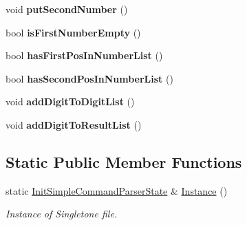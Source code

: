 \begin{DoxyCompactItemize}
\item 
\hypertarget{class_init_simple_command_parser_state_ae2125d4779a25e75508e1987d238e68a}{}void {\bfseries put\+Second\+Number} ()\label{class_init_simple_command_parser_state_ae2125d4779a25e75508e1987d238e68a}

\item 
\hypertarget{class_init_simple_command_parser_state_a55530e8566a3d016ff40ce298bcb7098}{}bool {\bfseries is\+First\+Number\+Empty} ()\label{class_init_simple_command_parser_state_a55530e8566a3d016ff40ce298bcb7098}

\item 
\hypertarget{class_init_simple_command_parser_state_a43d0006555f71a600de7eaef161b5f77}{}bool {\bfseries has\+First\+Pos\+In\+Number\+List} ()\label{class_init_simple_command_parser_state_a43d0006555f71a600de7eaef161b5f77}

\item 
\hypertarget{class_init_simple_command_parser_state_a57ef44dc2b40a0aaae1fde7a06c34774}{}bool {\bfseries has\+Second\+Pos\+In\+Number\+List} ()\label{class_init_simple_command_parser_state_a57ef44dc2b40a0aaae1fde7a06c34774}

\item 
\hypertarget{class_init_simple_command_parser_state_a800319ebedff0777cc14ac7b24b0f97e}{}void {\bfseries add\+Digit\+To\+Digit\+List} ()\label{class_init_simple_command_parser_state_a800319ebedff0777cc14ac7b24b0f97e}

\item 
\hypertarget{class_init_simple_command_parser_state_a39124f422acff0c66786b3561857d5b0}{}void {\bfseries add\+Digit\+To\+Result\+List} ()\label{class_init_simple_command_parser_state_a39124f422acff0c66786b3561857d5b0}

\end{DoxyCompactItemize}
\subsection*{Static Public Member Functions}
\begin{DoxyCompactItemize}
\item 
\hypertarget{class_init_simple_command_parser_state_a761ce473b750e07ab4b4c94bc0636f94}{}static \hyperlink{class_init_simple_command_parser_state}{Init\+Simple\+Command\+Parser\+State} \& \hyperlink{class_init_simple_command_parser_state_a761ce473b750e07ab4b4c94bc0636f94}{Instance} ()\label{class_init_simple_command_parser_state_a761ce473b750e07ab4b4c94bc0636f94}

\begin{DoxyCompactList}\small\item\em Instance of Singletone file. \end{DoxyCompactList}\end{DoxyCompactItemize}
